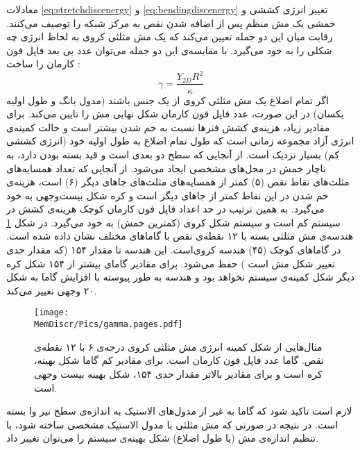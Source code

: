معادلات
\ref{eq:stretchdiscenergy}
و
\ref{eq:bendingdiscenergy}
تغییر انرژی کششی و خمشی یک مش منظم پس از اضافه شدن نقص به مرکز شبکه را توصیف می‌کنند. رقابت میان این دو جمله تعیین می‌کند که یک مش مثلثی کروی به لحاظ انرژی چه شکلی را به خود می‌گیرد. با مقایسه‌ی این دو جمله می‌توان عدد بی بعد  فاپل فون کارمان
را ساخت
\cite{nelsonPRE2003}
:
\begin{equation}
\gamma = \frac{Y_{2D}R^2}{\kappa}
\label{eq:gamma}
\end{equation}
اگر تمام اضلاع یک مش مثلثی کروی از یک جنس باشند (مدول یانگ و طول اولیه یکسان) در این صورت، عدد فاپل فون کارمان شکل نهایی مش را تایین می‌کند. برای مقادیر زیاد، هزینه‌ی کشش فنر‌ها نسبت به خم شدن بیشتر است و حالت کمینه‌ی انرژی آزاد مجموعه زمانی‌ است که طول تمام اضلاع به طول اولیه‌ خود (انرژی کششی کم) بسیار نزدیک است. از آنجایی که سطح دو بعدی است و قید بسته بودن دارد، به ناچار خمش در محل‌های مشخصی ایجاد می‌شود. از آنجایی که تعداد همسایه‌های مثلث‌های نقاط نقص (۵) کمتر از همسایه‌های مثلث‌های جاهای دیگر (۶) است، هزینه‌ی خم شدن در این نقاط کمتر از جاهای دیگر است و کره شکل بیست‌وجهی
به خود می‌گیرد.
به همین ترتیب در حد اعداد فاپل فون کارمان کوچک هزینه‌ی کشش در سیستم کم است و سیستم شکل کروی (کمترین خمش) به خود می‌گیرد. در شکل
\ref{fig:gamma}
هندسه‌ی مش مثلثی بسته با ۱۲ نقطه‌ی نقص با گاماهای مختلف نشان داده شده است. در گاماها‌ی کوچک (۴۵) هندسه کروی‌است. این هندسه تا مقدار ۱۵۴ (که مقدار حدی تغییر شکل مش است
\cite{nelsonPRE2003}
) حفظ می‌شود. برای مقادیر گامای بیشتر از ۱۵۴ شکل کره دیگر شکل کمینه‌ی سیستم نخواهد بود و هندسه به طور پیوسته با افزایش گاما به شکل ۲۰ وجهی تغییر می‌کند.
\begin{figure}[h]
\begin{center}
\texttt{[image: \\MemDiscr/Pics/gamma.pages.pdf]}
\caption{
مثال‌هایی از شکل کمینه انرژی مش مثلثی کروی درجه‌ی ۶ با ۱۲ نقطه‌ی نقص. گاما عدد فاپل فون کارمان است. برای مقادیر کم گاما شکل بهینه، کره است و برای مقادیر بالاتر مقدار حدی ۱۵۴، شکل بهینه بیست وجهی است.
}
\label{fig:gamma}
\end{center}
\end{figure}
لازم است تاکید شود که گاما به غیر از مدول‌های الاستیک به اندازه‌ی سطح نیز وا بسته است. در نتیجه در صورتی که مش مثلثی با مدول الاستیک مشخصی ساخته شود، با تنظیم اندازه‌ی مش (یا طول اضلاع) شکل بهینه‌ی سیستم را می‌توان تغییر داد.







